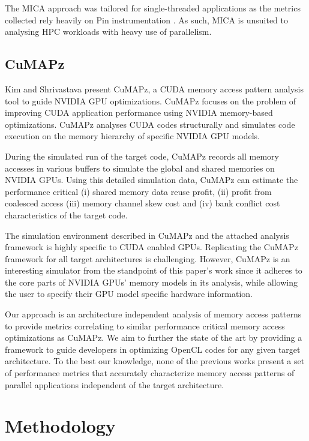 \documentclass[review=false, sigchi]{acmart}
\begin{document}
	The MICA approach was tailored for single-threaded applications as the metrics collected rely heavily on Pin instrumentation \cite{luk2005pin}. As such, MICA is unsuited to analysing HPC workloads with heavy use of parallelism.

	\subsection{CuMAPz}
	
	Kim and Shrivastava \cite{kim2011cumapz} present CuMAPz, a CUDA memory access pattern analysis tool to guide NVIDIA GPU optimizations. CuMAPz focuses on the problem of improving CUDA application performance using NVIDIA memory-based optimizations. CuMAPz analyses CUDA codes structurally and simulates code execution on the memory hierarchy of specific NVIDIA GPU models.
	
	During the simulated run of the target code, CuMAPz records all memory accesses in various buffers to simulate the global and shared memories on NVIDIA GPUs. Using this detailed simulation data, CuMAPz can estimate the performance critical (i) shared memory data reuse profit, (ii) profit from coalesced access (iii) memory channel skew cost and (iv) bank conflict cost characteristics of the target code.
	
	The simulation environment described in CuMAPz and the attached analysis framework is highly specific to CUDA enabled GPUs. Replicating the CuMAPz framework for all target architectures is challenging. However, CuMAPz is an interesting simulator from the standpoint of this paper's work since it adheres to the core parts of NVIDIA GPUs' memory models in its analysis, while allowing the user to specify their GPU model specific hardware information.
	
	Our approach is an architecture independent analysis of memory access patterns to provide metrics correlating to similar performance critical memory access optimizations as CuMAPz. We aim to further the state of the art by providing a framework to guide developers in optimizing OpenCL codes for any given target architecture. To the best our knowledge, none of the previous works present a set of performance metrics that accurately characterize memory access patterns of parallel applications independent of the target architecture.
	
	\section{Methodology} \label{method}
	
\end{document}
